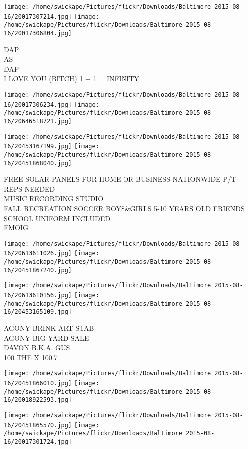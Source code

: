 \documentclass[10pt,letterpaper]{article}
\begin{document}
\texttt{[image: /home/swickape/Pictures/flickr/Downloads/Baltimore 2015-08-16/20017307214.jpg]}
\texttt{[image: /home/swickape/Pictures/flickr/Downloads/Baltimore 2015-08-16/20017306804.jpg]}

DAP\\
AS\\
DAP\\
I LOVE YOU (BITCH) 1 + 1 = INFINITY\\
\pagebreak

\texttt{[image: /home/swickape/Pictures/flickr/Downloads/Baltimore 2015-08-16/20017306234.jpg]}
\texttt{[image: /home/swickape/Pictures/flickr/Downloads/Baltimore 2015-08-16/20646518721.jpg]}

\texttt{[image: /home/swickape/Pictures/flickr/Downloads/Baltimore 2015-08-16/20453167199.jpg]}
\texttt{[image: /home/swickape/Pictures/flickr/Downloads/Baltimore 2015-08-16/20451868040.jpg]}

FREE SOLAR PANELS FOR HOME OR BUSINESS NATIONWIDE P/T REPS NEEDED\\
MUSIC RECORDING STUDIO\\
FALL RECREATION SOCCER BOYS\&GIRLS 5{-}10 YEARS OLD FRIENDS SCHOOL UNIFORM INCLUDED\\
FMOIG\\
\pagebreak

\texttt{[image: /home/swickape/Pictures/flickr/Downloads/Baltimore 2015-08-16/20613611026.jpg]}
\texttt{[image: /home/swickape/Pictures/flickr/Downloads/Baltimore 2015-08-16/20451867240.jpg]}

\texttt{[image: /home/swickape/Pictures/flickr/Downloads/Baltimore 2015-08-16/20613610156.jpg]}
\texttt{[image: /home/swickape/Pictures/flickr/Downloads/Baltimore 2015-08-16/20453165109.jpg]}

AGONY BRINK ART STAB\\
AGONY BIG YARD SALE\\
DAVON B.K.A. GUS\\
100 THE X 100.7\\
\pagebreak

\texttt{[image: /home/swickape/Pictures/flickr/Downloads/Baltimore 2015-08-16/20451866010.jpg]}
\texttt{[image: /home/swickape/Pictures/flickr/Downloads/Baltimore 2015-08-16/20018922593.jpg]}

\texttt{[image: /home/swickape/Pictures/flickr/Downloads/Baltimore 2015-08-16/20451865570.jpg]}
\texttt{[image: /home/swickape/Pictures/flickr/Downloads/Baltimore 2015-08-16/20017301724.jpg]}
\end{document}
